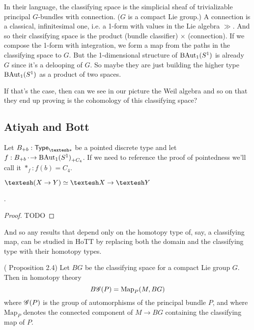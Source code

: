\documentclass[12pt]{article}
\begin{document}
In their language, the classifying space is the simplicial sheaf of trivializable principal \( G \)-bundles with connection. (\( G \) is a compact Lie group.) A connection is a classical, infinitesimal one, i.e. a 1-form with values in the Lie algebra \( \gg \). And so their classifying space is the product (bundle classifier) \( \times \) (connection). If we compose the 1-form with integration, we form a map from the paths in the classifying space to \( G \). But the 1-dimensional structure of \( \mathrm{BAut}_1(S^1) \) is already \( G \) since it's a delooping of \( G \). So maybe they are just building the higher type \( \mathrm{BAut}_1(S^1) \) as a product of two spaces.

If that's the case, then can we see in our picture the Weil algebra and so on that they end up proving is the cohomology of this classifying space?

\subsection{Atiyah and Bott}

Let \( \Bpb:\Typesp \) be a pointed discrete type and let \( f:{B}_{+{b}}\,\cdot\!\to{\mathrm{BAut}_1(S^1)}_{+{C_4}} \). If we need to reference the proof of pointedness we'll call it \( *_f:f(b)=C_4 \). 

\begin{mylemma} \( \shape(X\to Y)\simeq \shape X\to \shape Y \)\end{mylemma}.
\begin{proof}
TODO
\end{proof}

And so any results that depend only on the homotopy type of, say, a classifying map, can be studied in HoTT by replacing both the domain and the classifying type with their homotopy types.

\begin{myprop}(\cite{atiyah1983yang} Proposition 2.4)
  Let \( BG \) be the classifying space for a compact Lie group \( G \). Then in homotopy theory 
  \[ 
    B\mathscr{G}(P)=\mathrm{Map}_P(M, BG) 
  \]
  where \( \mathscr{G}(P) \) is the group of automorphisms of the principal bundle \( P \), and where \( \mathrm{Map}_P \) denotes the connected component of \( M\to BG \) containing the classifying map of \( P \).
\end{myprop}


\end{document}
